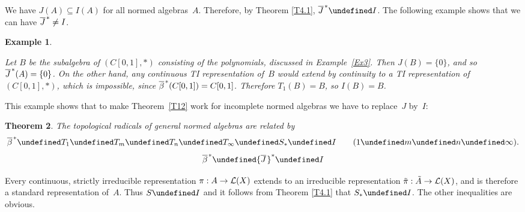 \documentclass[11pt]{article}
\newcommand{\sseq}{\subseteq}
\let\leq\undefined  \let\geq\undefined
\let\le\leq   \let\ge\geq
\newcommand{\closure}[1]{\overline{#1}}
\newtheorem{thm}{Theorem}[section]
\newenvironment{Proof}{{\it Proof. }}{}%
\newtheorem{example}[thm]{Example}
\newenvironment{Example}{\begin{example}\begin{rm}}{\end{rm}\end{example}}
\newcommand{\detail}[1]{}
\newcommand{\barstar}[1]{{\closure{#1}\kern 1pt}^*}
\newcommand{\LX}{{\cal L}(X)}
\begin{document}
We have $J(A) \sseq I(A)$ for all normed algebras~$A$.   Therefore, by
Theorem \ref{T4.1}, $\barstar J \le I$.
The following example shows that we can have $\barstar J \ne I$.

\begin{Example}\label{Ex4}
Let $B$ be the subalgebra of $(C[0,1],*)$ consisting of the polynomials,
discussed in Example~\ref{Ex3}. Then $J(B) = \{0\}$, and so
$\barstar J(A) = \{0\}$. On the other hand, any continuous TI representation
of~$B$ would extend by continuity to a TI representation of $(C[0,1],*)$,
which is impossible, since $\barstar\beta(C[0,1]) = C[0,1]$. Therefore
$T_1(B) = B$, so $I(B) = B$.
\end{Example}

This example shows that to make Theorem~\ref{T12}
work for incomplete normed algebras we have to replace~$J$ by~$I$:

\begin{thm}\label{T12i}
The topological radicals of general normed algebras are related by
$$\barstar\beta \le T_1 \le T_m \le T_n \le T_\infty \le S_* \le I
                                       \qquad (1 \le m \le n \le \infty).$$
$$\barstar\beta \le \barstar J \le I$$
\end{thm}

\begin{Proof}
Every continuous, strictly irreducible representation $\pi:A \to \LX$ extends to an
irreducible representation $\tilde\pi:\tilde A \to \LX$, and is therefore a
standard representation of~$A$.  Thus $S \le I$ and it follows from \detail{the
general normed algebra version of} Theorem \ref{T4.1} that $S_* \le I$.    The
other inequalities are obvious.
\end{Proof}
\end{document}
